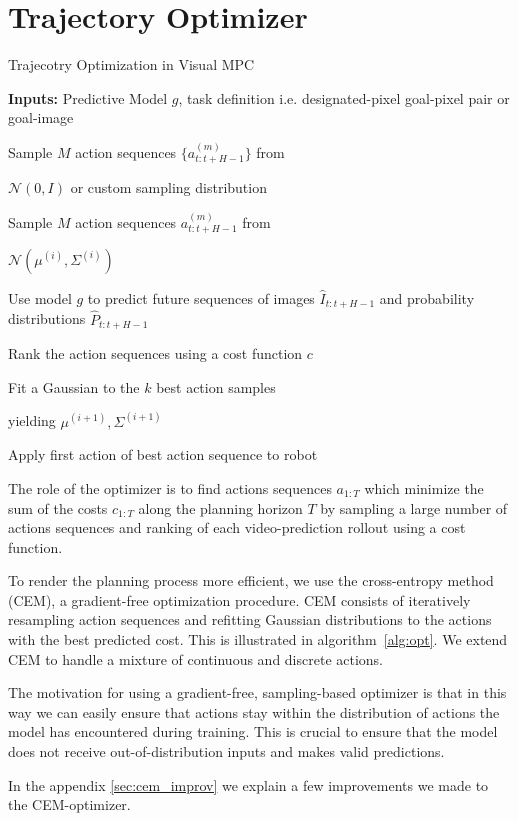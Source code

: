 \section{Trajectory Optimizer}

\begin{algorithm}[ht]
\caption{Trajecotry Optimization in Visual MPC}
\label{alg:opt}
\begin{algorithmic}[1]
\State \textbf{Inputs:} Predictive Model $g$, task definition i.e. designated-pixel goal-pixel pair or goal-image

\State \begin{varwidth}[t]{\linewidth}
	Sample $M$ action sequences $\{a^{(m)}_{t:t+H-1}\}$ from \par $\mathcal N(0, I)$ or
	custom sampling distribution
\end{varwidth}
\Else
\State \begin{varwidth}[t]{\linewidth}
	Sample $M$ action sequences ${a^{(m)}_{t:t+H-1}}$ from \par 
	$\mathcal N(\mu^{(i)}, \Sigma^{(i)})$
\end{varwidth}
\EndIf
\State  \begin{varwidth}[t]{\linewidth}
	Use model $g$ to predict future sequences of images $\hat{I}_{t:t+H-1}$ and probability distributions $\hat{P}_{t:t+H-1}$
\end{varwidth}
\State Rank the action sequences using a cost function $c$
\State  \begin{varwidth}[t]{\linewidth}
	Fit a Gaussian to the $k$ best action samples \par 
	yielding $\mu^{(i+1)}, \Sigma^{(i+1)}$
\end{varwidth}
\EndFor
\State Apply first action of best action sequence to robot
\EndFor
\end{algorithmic}
\end{algorithm}


\label{sec:optimizer}
The role of the optimizer is to find actions sequences $a_{1:T}$ which minimize the sum of the costs $c_{1:T}$ along the planning horizon $T$ by sampling a large number of actions sequences and ranking of each video-prediction rollout using a cost function.

To render the planning process more efficient, we use the cross-entropy method (CEM), a gradient-free optimization procedure.
CEM consists of iteratively resampling action sequences and refitting Gaussian distributions to the actions with the best predicted cost. This is illustrated in algorithm~\ref{alg:opt}.
We extend CEM to handle a mixture of continuous and discrete actions.

The motivation for using a gradient-free, sampling-based optimizer is that in this way we can easily ensure that actions stay within the distribution of actions the model has encountered during training. This is crucial to ensure that the model does not receive out-of-distribution inputs and makes valid predictions. 

In the appendix \ref{sec:cem_improv} we explain a few improvements we made to the CEM-optimizer.